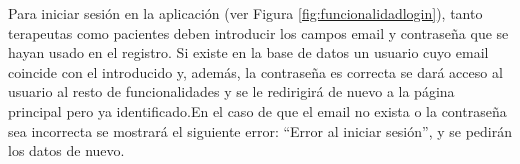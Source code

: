 




Para iniciar sesión en la aplicación (ver Figura \ref{fig:funcionalidadlogin}), tanto terapeutas como pacientes deben introducir los campos email y contraseña que se hayan usado en el registro. Si existe en la base de datos un usuario cuyo email coincide con el introducido y, además, la contraseña es correcta se dará acceso al usuario al resto de funcionalidades y se le redirigirá de nuevo a la página principal pero ya identificado.En el caso de que el email no exista o la contraseña sea incorrecta se mostrará el siguiente error: ``Error al iniciar sesión'', y se pedirán los datos de nuevo.

